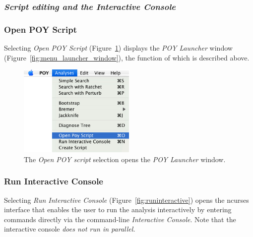 \subsubsection{\emph{Script editing and the Interactive Console}}

\subsubsection{Open POY Script}

Selecting \emph{Open POY Script} (Figure~\ref{fig:open_poy_script}) displays the \emph{POY Launcher} 
window (Figure~\ref{fig:menu_launcher_window}), the function of which is described above.

\begin{figure}[htpb]
    \begin{center}
        \includegraphics[width=0.5\textwidth]{figures/OpenPoyScript_Menu.jpg}
    \end{center}
    \caption{The \emph{Open POY script} selection opens the \emph{POY Launcher} window.}
    \label{fig:open_poy_script}
\end{figure}

\subsubsection{Run Interactive Console}

Selecting \emph{Run Interactive Console} (Figure~\ref{fig:runinteractive}) opens the ncurses interface
that enables the user to run the analysis interactively by entering
\poy commands directly via the command-line \emph{Interactive
Console}. Note that the interactive console \emph{does not run in parallel.}

